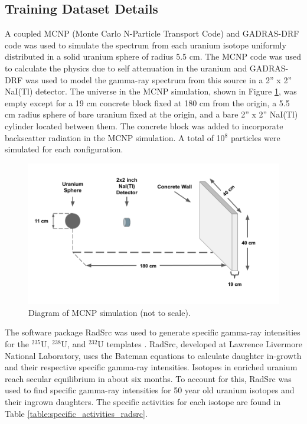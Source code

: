 \subsection{Training Dataset Details}

A coupled MCNP (Monte Carlo N-Particle Transport Code) and GADRAS-DRF code was used to simulate the spectrum from each uranium isotope uniformly distributed in a solid uranium sphere of radius 5.5 cm. The MCNP code was used to calculate the physics due to self attenuation in the uranium and GADRAS-DRF was used to model the gamma-ray spectrum from this source in a 2'' x 2'' NaI(Tl) detector. The universe in the MCNP simulation, shown in Figure \ref{fig:mcnp_diagram}, was empty except for a 19 cm concrete block fixed at 180 cm from the origin, a 5.5 cm radius sphere of bare uranium fixed at the origin, and a bare 2'' x 2'' NaI(Tl) cylinder located between them. The concrete block was added to incorporate backscatter radiation in the MCNP simulation. A total of 10$^{8}$ particles were simulated for each configuration.

\begin{figure}[H]
	\centering
    \includegraphics[trim=50 50 50 50,clip,width=0.99\linewidth]{images/mcnp_diagram.png}
	\caption{Diagram of MCNP simulation (not to scale).}
	\label{fig:mcnp_diagram}
\end{figure}

The software package RadSrc was used to generate specific gamma-ray intensities for the $^{235}$U, $^{238}$U, and $^{232}$U templates \cite{Hiller2007}. RadSrc, developed at Lawrence Livermore National Laboratory, uses the Bateman equations to calculate daughter in-growth and their respective specific gamma-ray intensities. Isotopes in enriched uranium reach secular equilibrium in about six months. To account for this, RadSrc was used to find specific gamma-ray intensities for 50 year old uranium isotopes and their ingrown daughters. The specific activities for each isotope are found in Table \ref{table:specific_activities_radsrc}.

